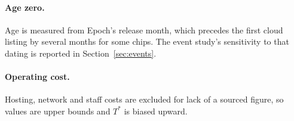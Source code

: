 \paragraph{Age zero.} Age is measured from Epoch's release month, which precedes the first cloud
listing by several months for some chips. The event study's sensitivity to that dating is reported
in Section~\ref{sec:events}.

\paragraph{Operating cost.} Hosting, network and staff costs are excluded for lack of a sourced
figure, so values are upper bounds and $T^*$ is biased upward.
